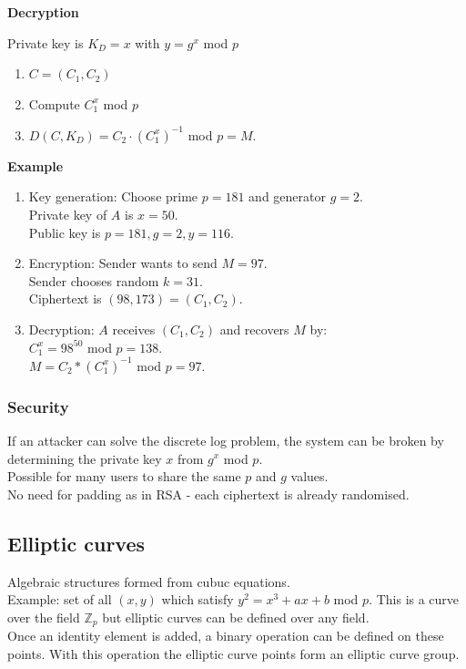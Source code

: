 \documentclass{article}
\begin{document}
\textbf{Decryption}

Private key is $K_D=x$ with $y=g^x$ mod $p$
\begin{enumerate}
    \item $C=(C_1,C_2)$
    \item Compute $C_1^x$ mod $p$
    \item $D(C, K_D) = C_2 \cdot (C_1^x)^{-1}$ mod $p = M$.
\end{enumerate}

\textbf{Example}

\begin{enumerate}
    \item Key generation: Choose prime $p=181$ and generator $g=2$.\\
    Private key of $A$ is $x=50$.\\
    Public key is $p=181, g=2, y=116$.\\
    \item Encryption: Sender wants to send $M = 97$.\\
    Sender chooses random $k = 31$.\\
    Ciphertext is $(98,173)=(C_1, C_2)$.
    \item Decryption: $A$ receives $(C_1, C_2)$ and recovers $M$ by:\\
    $C_1^x = 98^{50}$ mod $p = 138$.\\
    $M = C_2 * (C_1^x)^{-1}$ mod $p = 97$.
\end{enumerate}

\subsubsection{Security}

If an attacker can solve the discrete log problem, the system can be broken by determining the private key $x$ from $g^x$ mod $p$.\\
Possible for many users to share the same $p$ and $g$ values.\\
No need for padding as in RSA - each ciphertext is already randomised.

\subsection{Elliptic curves}

Algebraic structures formed from cubuc equations.\\
Example: set of all $(x,y)$ which satisfy $y^2= x^3+ax+b$ mod $p$. This is a curve over the field $\mathbb{Z}_p$ but elliptic curves can be defined over any field.\\
Once an identity element is added, a binary operation can be defined on these points. With this operation the elliptic curve points form an elliptic curve group.
\end{document}
